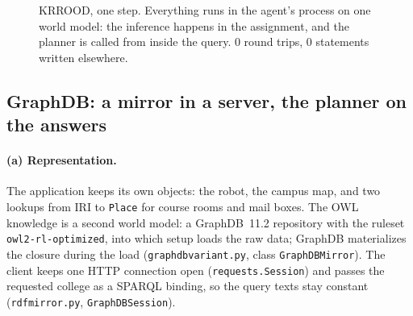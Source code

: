 \documentclass[10pt]{article}
\newcommand{\brkunderscore}{\textunderscore\allowbreak}
\newcommand{\code}[1]{{\let\_\brkunderscore\texttt{#1}}}
\newcommand{\file}[1]{{\let\_\brkunderscore\texttt{#1}}}
\def\cA{1.55}\def\cB{4.05}\def\cC{6.55}\def\cD{9.05}\def\cE{11.55}\def\cF{14.05}
\def\yP{0.85}\def\yX{-1.5}
\newcommand{\headers}[6]{%
  \node[head] at (\cA,2.45) {#1}; \node[head] at (\cB,2.45) {#2}; \node[head] at (\cC,2.45) {#3};
  \node[head] at (\cD,2.45) {#4}; \node[head] at (\cE,2.45) {#5}; \node[head] at (\cF,2.45) {#6};}
\newcommand{\pylane}[1]{%
  \draw[lane=pyline, fill=pyfill] (0,0) rectangle (15.4,2.15);
  \node[lanelabel, text=pyline] at (0,2.15) {#1};}
\newcommand{\nolane}[1]{%
  \draw[lane=black!35, dashed] (0,-2.8) rectangle (15.4,-0.55);
  \node[empty] at (7.7,-1.67) {#1};}
\newcommand{\tagM}[1]{\node[badge=tagM, anchor=south east] at ([xshift=-1pt,yshift=1pt]#1.north east) {M};}
\newcommand{\tagP}[1]{\node[badge=tagP, anchor=south east] at ([xshift=-1pt,yshift=1pt]#1.north east) {P};}
\begin{document}
\begin{figure}[t]
\centering
{}
\caption{KRROOD, one step. Everything runs in the agent's process on one world model: the inference happens in the
assignment, and the planner is called from inside the query. 0 round trips, 0 statements written elsewhere.}
\label{fig:krrood}
\end{figure}

\subsection{GraphDB: a mirror in a server, the planner on the answers}
\label{sec:graphdb}

\paragraph{(a) Representation.} The application keeps its own objects: the robot, the campus map, and two lookups from
IRI to \code{Place} for course rooms and mail boxes. The OWL knowledge is a second world model: a GraphDB~11.2 repository
with the ruleset \code{owl2-rl-optimized}, into which setup loads the raw data; GraphDB materializes the closure during
the load (\file{graphdb\_variant.py}, class \code{GraphDBMirror}). The client keeps one HTTP connection open
(\code{requests.Session}) and passes the requested college as a SPARQL binding, so the query texts stay constant
(\file{rdf\_mirror.py}, \code{GraphDBSession}).
\end{document}
